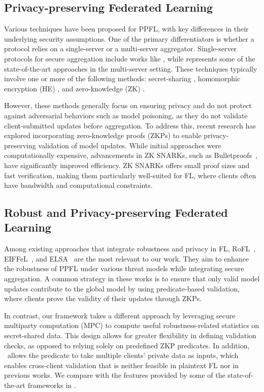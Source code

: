 \subsection{Privacy-preserving Federated Learning}
Various techniques have been proposed for PPFL, with key differences in their underlying security assumptions.
One of the primary differentiators is whether a protocol relies on a single-server or a multi-server aggregator. 
Single-server protocols for secure aggregation include works like \cite{CCS:BBGLR20,SP:MWAPR23,rofl,CCS:CGJv22}, while \cite{SP:RSWP23,scionfl} represents some of the state-of-the-art approaches in the multi-server setting. These techniques typically involve one or more of the following methods: secret-sharing \cite{SP:MWAPR23}, homomorphic encryption (HE) \cite{CCS:BIKMMP17}, and zero-knowledge (ZK) \cite{rofl,CCS:CGJv22}. 


However, these methods generally focus on ensuring privacy and do not protect against adversarial behaviors such as model poisoning, as they do not validate client-submitted updates before aggregation.
To address this, recent research has explored incorporating zero-knowledge proofs (ZKPs) to enable privacy-preserving validation of model updates. 
While initial approaches were computationally expensive, advancements in ZK SNARKs, such as Bulletproofs~\cite{SP:BBBPWM18}, have significantly improved efficiency. 
ZK SNARKs offers small proof sizes and fast verification, making them particularly well-suited for FL, where clients often have bandwidth and computational constraints.




\subsection{Robust and Privacy-preserving Federated Learning}

Among existing approaches that integrate robustness and privacy in FL, RoFL~\cite{rofl}, EIFFeL~\cite{CCS:CGJv22}, and ELSA~\cite{elsa} are the most relevant to our work.
They aim to enhance the robustness of PPFL under various threat models while integrating secure aggregation. 
A common strategy in these works is to ensure that only valid model updates contribute to the global model by using predicate-based validation, where clients prove the validity of their updates through ZKPs.

In contrast, our framework takes a different approach by leveraging secure multiparty computation (MPC) to compute useful robustness-related statistics on secret-shared data. 
This design allows for greater flexibility in defining validation checks, as opposed to relying solely on predefined ZKP predicates. 
In addition, \ours~allows the predicate to take multiple clients' private data as inputs, which enables cross-client validation that is neither feasible in plaintext FL nor in previous works. 
We compare with the features provided by some of the state-of-the-art frameworks in .

